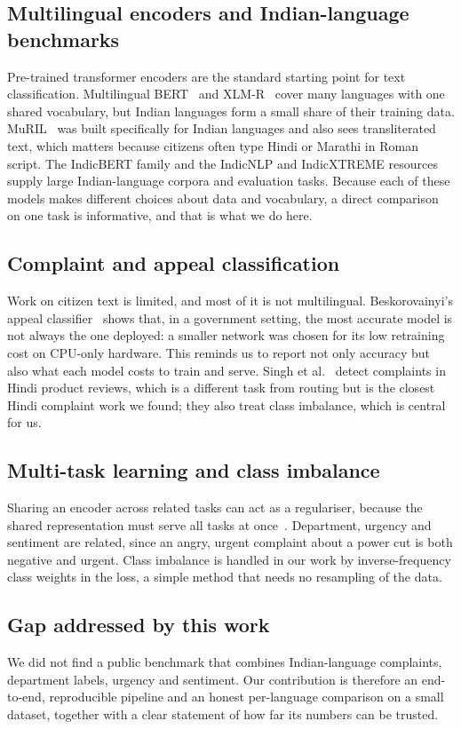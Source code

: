 \documentclass[conference]{IEEEtran}
\begin{document}
\subsection{Multilingual encoders and Indian-language benchmarks}
Pre-trained transformer encoders are the standard starting point for text classification. Multilingual BERT~\cite{devlin2019bert} and XLM-R~\cite{conneau2020xlmr} cover many languages with one shared vocabulary, but Indian languages form a small share of their training data.
MuRIL~\cite{khanuja2021muril} was built specifically for Indian languages and also sees transliterated text, which matters because citizens often type Hindi or Marathi in Roman script.
The IndicBERT family and the IndicNLP and IndicXTREME resources~\cite{kakwani2020indicnlp,doddapaneni2023towards} supply large Indian-language corpora and evaluation tasks.
Because each of these models makes different choices about data and vocabulary, a direct comparison on one task is informative, and that is what we do here.
\subsection{Complaint and appeal classification}
Work on citizen text is limited, and most of it is not multilingual. Beskorovainyi's appeal classifier~\cite{beskorovainyi2026appeals} shows that, in a government setting, the most accurate model is not always the one deployed:
a smaller network was chosen for its low retraining cost on CPU-only hardware. This reminds us to report not only accuracy but also what each model costs to train and serve.
Singh et al.~\cite{singh2020complaints} detect complaints in Hindi product reviews, which is a different task from routing but is the closest Hindi complaint work we found; they also treat class imbalance, which is central for us.
\subsection{Multi-task learning and class imbalance}
Sharing an encoder across related tasks can act as a regulariser, because the shared representation must serve all tasks at once~\cite{caruana1997multitask,ruder2017overview}.
Department, urgency and sentiment are related, since an angry, urgent complaint about a power cut is both negative and urgent.
Class imbalance is handled in our work by inverse-frequency class weights in the loss, a simple method that needs no resampling of the data.
\subsection{Gap addressed by this work}
We did not find a public benchmark that combines Indian-language complaints, department labels, urgency and sentiment. Our contribution is therefore an end-to-end, reproducible pipeline and an honest per-language comparison on a small dataset, together with a clear statement of how far its numbers can be trusted.
\end{document}
